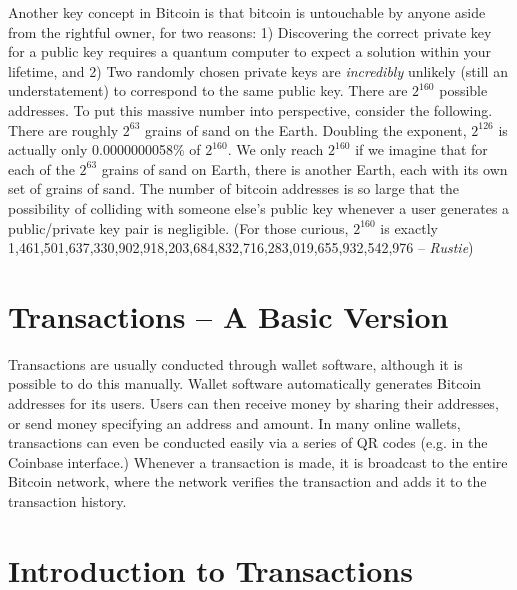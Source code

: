 \documentclass[11pt]{article}
\begin{document}
    Another key concept in Bitcoin is that bitcoin is untouchable by anyone aside from the rightful owner, for two reasons: 1) Discovering the correct private key for a public key requires a quantum computer to expect a solution within your lifetime, and 2) Two randomly chosen private keys are \textit{incredibly} unlikely (still an understatement) to correspond to the same public key. There are $2^{160}$ possible addresses. To put this massive number into perspective, consider the following. There are roughly $2^{63}$ grains of sand on the Earth. Doubling the exponent, $2^{126}$ is actually only 0.0000000058\% of $2^{160}$. We only reach $2^{160}$ if we imagine that for each of the $2^{63}$ grains of sand on Earth, there is another Earth, each with its own set of grains of sand. The number of bitcoin addresses is so large that the possibility of colliding with someone else's public key whenever a user generates a public/private key pair is negligible. (For those curious, $2^{160}$ is exactly 1,461,501,637,330,902,918,203,684,832,716,283,019,655,932,542,976 -- \textit{Rustie}) 
    
    \section*{Transactions -- A Basic Version}
    
    Transactions are usually conducted through wallet software, although it is possible to do this manually. Wallet software automatically generates Bitcoin addresses for its users. Users can then receive money by sharing their addresses, or send money specifying an address and amount. In many online wallets, transactions can even be conducted easily via a series of QR codes (e.g. in the Coinbase interface.) Whenever a transaction is made, it is broadcast to the entire Bitcoin network, where the network verifies the transaction and adds it to the transaction history.
    
    \section*{Introduction to Transactions}
    
\end{document}
